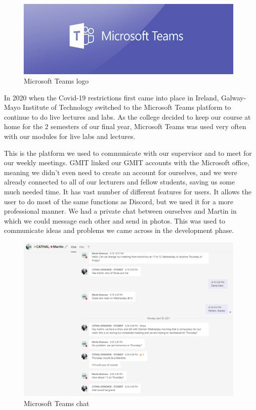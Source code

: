 \begin{figure}[hb]
\renewcommand\thefigure{3.20}
\centering
\includegraphics[scale=0.4]{img/teams-728.jpg}
\caption{Microsoft Teams logo}
\label{TeamsLogo}
\end{figure}

In 2020 when the Covid-19 restrictions first came into place in Ireland, Galway-Mayo Institute of Technology switched to the Microsoft Teams platform to continue to do live lectures and labs. As the college decided to keep our course at home for the 2 semesters of our final year, Microsoft Teams was used very often with our modules for live labs and lectures. \par
This is the platform we used to communicate with our supervisor and to meet for our weekly meetings. GMIT linked our GMIT accounts with the Microsoft office, meaning we didn't even need to create an account for ourselves, and we were already connected to all of our lecturers and fellow students, saving us some much needed time. It has vast number of different features for users. It allows the user to do most of the same functions as Discord, but we used it for a more professional manner. We had a private chat between ourselves and Martin in which we could message each other and send in photos. This was used to communicate ideas and problems we came across in the development phase. \par

\begin{figure}[ht]
\renewcommand\thefigure{3.21}
\centering
\includegraphics[scale=0.5]{img/teams.PNG}
\caption{Microsoft Teams chat}
\label{TeamsChat}
\end{figure}

